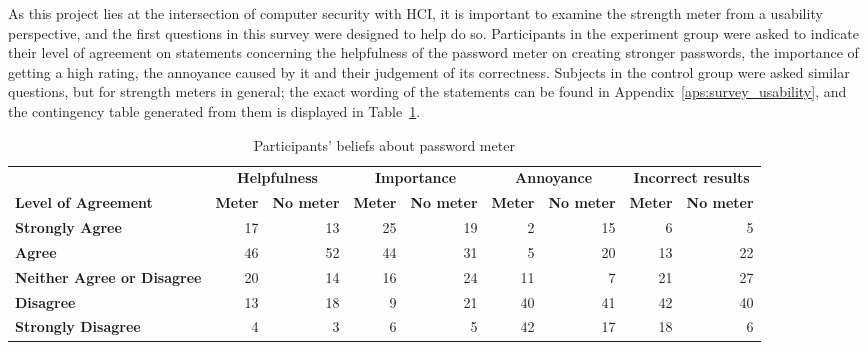    As this project lies at the intersection of computer security with HCI, it is important to examine the strength meter from a usability perspective, and the first questions in this survey were designed to help do so. Participants in the experiment group were asked to indicate their level of agreement on statements concerning the helpfulness of the password meter on creating stronger passwords, the importance of getting a high rating, the annoyance caused by it and their judgement of its correctness. Subjects in the control group were asked similar questions, but for strength meters in general; the exact wording of the statements can be found in Appendix~\ref{aps:survey_usability}, and the contingency table generated from them is displayed in Table~\ref{tab:beliefs}.

    \begin{table}[htpb]
      \centering
      \scriptsize
      \hspace*{-2cm}
      \begin{tabular}{p{3cm} rrrrrrrr}
        \toprule
         & \multicolumn{2}{c}{\textbf{Helpfulness}} & \multicolumn{2}{c}{\textbf{Importance}} & \multicolumn{2}{c}{\textbf{Annoyance}} & \multicolumn{2}{c}{\textbf{Incorrect results}} \\
        \textbf{Level of Agreement} & \textbf{Meter} & \textbf{No meter} & \textbf{Meter} & \textbf{No meter} & \textbf{Meter} & \textbf{No meter} & \textbf{Meter} & \textbf{No meter} \\
        \midrule
         \textbf{Strongly Agree} & 17 & 13 & 25 & 19 & 2 & 15 & 6 & 5 \\
         \textbf{Agree} & 46 & 52 & 44 & 31 & 5 & 20 & 13 & 22 \\
         \textbf{Neither Agree \newline or Disagree} & 20 & 14 & 16 & 24 & 11 & 7 & 21 & 27 \\
         \textbf{Disagree} & 13 & 18 & 9 & 21 & 40 & 41 & 42 & 40 \\
         \textbf{Strongly Disagree} & 4 & 3 & 6 & 5 & 42 & 17 & 18 & 6\\
        \bottomrule
      \end{tabular}
      \caption{Participants' beliefs about password meter}
      \label{tab:beliefs}
    \end{table}

